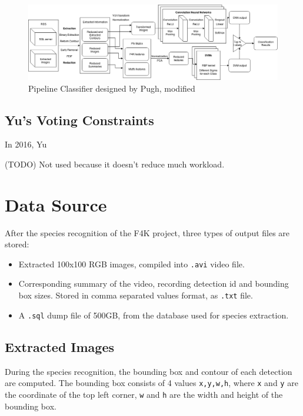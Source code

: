 \documentclass[bsc,logo,twoside,fullspacing,parskip]{infthesis}
\begin{document}
\begin{figure}[!t]
    \centering
    \includegraphics[scale=0.34]{graph/Pipeline_Classifier.png}
    \caption{Pipeline Classifier designed by Pugh, modified}
    \label{fig:pipeline}
\end{figure}

\section{Yu's Voting Constraints}

In 2016, Yu 

(TODO) Not used because it doesn't reduce much workload.


\chapter{Data Source}
\label{sec:datasource}

After the species recognition of the F4K project, three types of output files are stored:
\begin{itemize}
\item
Extracted 100x100 RGB images, compiled into {\tt .avi} video file.
\item
Corresponding summary of the video, recording detection id and bounding box sizes. Stored in comma separated values format, as {\tt .txt} file.
\item
A {\tt .sql} dump file of 500GB, from the database used for species extraction.
\end{itemize}

\section{Extracted Images}
\label{sec:summaries}

During the species recognition, the bounding box and contour of each detection are computed.
The bounding box consists of 4 values {\tt x,y,w,h}, where {\tt x} and {\tt y} are the coordinate of the top left corner, {\tt w} and {\tt h} are the width and height of the bounding box. 
\end{document}
